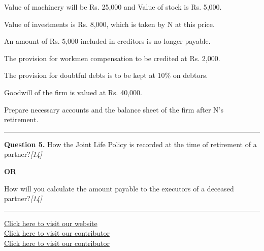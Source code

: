 \documentclass[11pt,a4paper]{article}
\newcommand{\pts}[1]{\hfill   \textit{[#1]}}
\begin{document}
\begin{parts}
  \item Value of machinery will be Rs. 25,000 and Value of stock is Rs. 5,000.
  \item Value of investments is Rs. 8,000, which is taken by N at this price.
  \item An amount of Rs. 5,000 included in creditors is no longer payable.
  \item The provision for workmen compensation to be credited at Rs. 2,000.
  \item The provision for doubtful debts is to be kept at 10\% on debtors.
  \item Goodwill of the firm is valued at Rs. 40,000.
\end{parts}
Prepare necessary accounts and the balance sheet of the firm after N's retirement.

\medskip\rule{\linewidth}{0.2pt}




\noindent   \textbf{Question 5.}
How the Joint Life Policy is recorded at the time of retirement of a partner?\pts{14}

\centerline{   \textbf{OR}}

How will you calculate the amount payable to the executors of a deceased partner?\pts{14}

\vfill
\rule{\linewidth}{0.4pt}

\begin{center}\small
\href{https://bhu-exam.vercel.app/}{Click here to visit our website}\\[4pt]
\href{https://me-aryan.vercel.app/}{Click here to visit our contributor}\\[4pt]
\href{https://quashan-me.vercel.app/}{Click here to visit our contributor}
\end{center}
\end{document}

